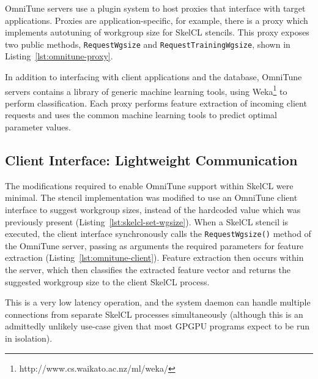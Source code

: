 OmniTune servers use a plugin system to host proxies that interface
with target applications. Proxies are application-specific, for
example, there is a proxy which implements autotuning of workgroup
size for SkelCL stencils. This proxy exposes two public methods,
\texttt{RequestWgsize} and \texttt{RequestTrainingWgsize}, shown in
Listing~\ref{lst:omnitune-proxy}.

In addition to interfacing with client applications and the database,
OmniTune servers contains a library of generic machine learning tools,
using Weka\footnote{http://www.cs.waikato.ac.nz/ml/weka/} to perform
classification. Each proxy performs feature extraction of incoming
client requests and uses the common machine learning tools to predict
optimal parameter values.




\subsection{Client Interface: Lightweight Communication}

The modifications required to enable OmniTune support within SkelCL
were minimal. The stencil implementation was modified to use an
OmniTune client interface to suggest workgroup sizes, instead of the
hardcoded value which was previously present
(Listing~\ref{lst:skelcl-set-wgsize}). When a SkelCL stencil is
executed, the client interface synchronously calls the
\texttt{RequestWgsize()} method of the OmniTune server, passing as
arguments the required parameters for feature extraction
(Listing~\ref{lst:omnitune-client}). Feature extraction then occurs
within the server, which then classifies the extracted feature vector
and returns the suggested workgroup size to the client SkelCL process.

This is a very low latency operation, and the system daemon can handle
multiple connections from separate SkelCL processes simultaneously
(although this is an admittedly unlikely use-case given that most
GPGPU programs expect to be run in isolation).



